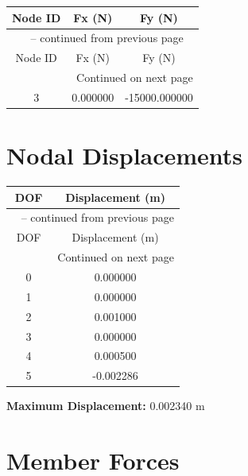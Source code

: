 \documentclass[11pt,a4paper]{article}
\begin{document}
\begin{longtable}{ccc}
\toprule
Node ID & Fx (N) & Fy (N) \\
\midrule
\endfirsthead

\multicolumn{3}{c}{{\tablename\ \thetable{} -- continued from previous page}} \\
\toprule
Node ID & Fx (N) & Fy (N) \\
\midrule
\endhead

\midrule
\multicolumn{3}{r}{{Continued on next page}} \\
\endfoot

\bottomrule
\endlastfoot

3 & 0.000000 & -15000.000000 \\
\end{longtable}

\section{Nodal Displacements}

\begin{longtable}{cc}
\toprule
DOF & Displacement (m) \\
\midrule
\endfirsthead

\multicolumn{2}{c}{{\tablename\ \thetable{} -- continued from previous page}} \\
\toprule
DOF & Displacement (m) \\
\midrule
\endhead

\midrule
\multicolumn{2}{r}{{Continued on next page}} \\
\endfoot

\bottomrule
\endlastfoot

0 & 0.000000 \\
1 & 0.000000 \\
2 & 0.001000 \\
3 & 0.000000 \\
4 & 0.000500 \\
5 & -0.002286 \\
\end{longtable}

\textbf{Maximum Displacement:} 0.002340 m

\section{Member Forces}
\end{document}
